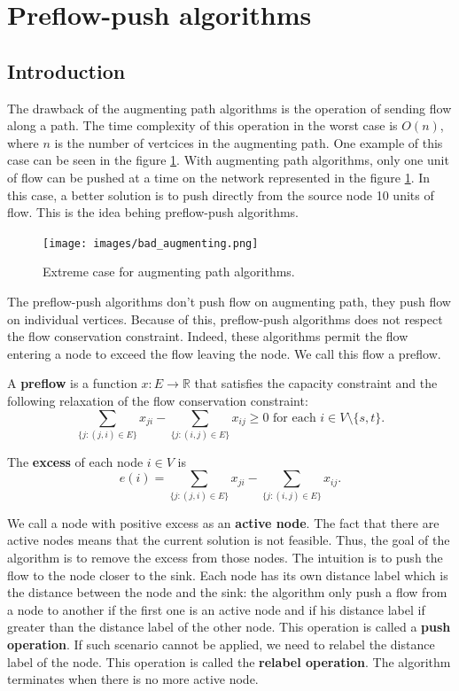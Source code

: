 \section{Preflow-push algorithms}

\subsection{Introduction}

The drawback of the augmenting path algorithms is the operation of sending flow along a path. The time complexity of this operation in the worst case is $O(n)$, where $n$ is the number of vertcices in the augmenting path. One example of this case can be seen in the figure \ref{img:bad_augmenting}. With augmenting path algorithms, only one unit of flow can be pushed at a time on the network represented in the figure \ref{img:bad_augmenting}. In this case, a better solution is to push directly from the source node 10 units of flow. This is the idea behing preflow-push algorithms.

\begin{figure}[H]
\centering
\texttt{[image: images/bad\_augmenting.png]}
\caption{Extreme case for augmenting path algorithms.}
\label{img:bad_augmenting}
\end{figure}

The preflow-push algorithms don't push flow on augmenting path, they push flow on individual vertices. Because of this, preflow-push algorithms does not respect the flow conservation constraint. Indeed, these algorithms permit the flow entering a node to exceed the flow leaving the node. We call this flow a preflow.

\begin{definition}
\label{preflow}
A \textbf{preflow} is a function $x: E \to \mathbb{R}$ that satisfies the capacity constraint and the following relaxation of the flow conservation constraint:
$$\sum\limits_{\{j : (j,i) \in E\}} x_{ji} - \sum\limits_{\{j : (i,j) \in E\}} x_{ij} \geq 0 \text{	for each } i \in V \setminus \{s, t\}.$$
\end{definition}

\begin{definition}
\label{excess}
The \textbf{excess} of each node $i \in V$ is 
$$e(i) = \sum\limits_{\{j : (j,i) \in E\}} x_{ji} - \sum\limits_{\{j : (i,j) \in E\}} x_{ij}.$$
\end{definition}

We call a node with positive excess as an \textbf{active node}. The fact that there are active nodes means that the current solution is not feasible. Thus, the goal of the algorithm is to remove the excess from those nodes. The intuition is to push the flow to the node closer to the sink. Each node has its own distance label which is the distance between the node and the sink: the algorithm only push a flow from a node to another if the first one is an active node and if his distance label if greater than the distance label of the other node. This operation is called a \textbf{push operation}. If such scenario cannot be applied, we need to relabel the distance label of the node. This operation is called the \textbf{relabel operation}. The algorithm terminates when there is no more active node.

